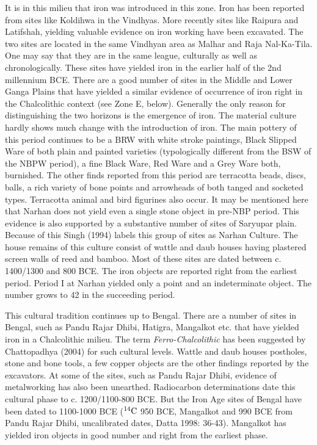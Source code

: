 It is in this milieu that iron was introduced in this zone. Iron has been reported from sites like Koldihwa in the Vindhyas. More recently sites like Raipura and Latifshah, yielding valuable evidence on iron working  have been excavated. The two sites are located in the same Vindhyan area as Malhar and Raja Nal-Ka-Tila. One may say that they are in the same league, culturally as well as chronologically. These sites have yielded iron in the earlier half of the 2nd millennium BCE. There are a good number of sites in the Middle and Lower Ganga Plains that have yielded a similar evidence of occurrence of iron right in the Chalcolithic context (see Zone E, below). Generally the only reason for distinguishing the two horizons is the emergence of iron. The material culture hardly shows much change with the introduction of iron. The main pottery of this period continues to be a BRW with white stroke paintings, Black Slipped Ware of both plain and painted varieties (typologically different from the BSW of the NBPW period), a fine Black Ware, Red Ware and a Grey Ware both, burnished.  The other finds reported from this period are terracotta beads, discs, balls, a rich variety of bone points and arrowheads of both tanged and socketed types. Terracotta animal and bird figurines also occur. It may be mentioned here that Narhan does not yield even a single stone object in pre-NBP period. This evidence is also supported by a substantive number of sites of Saryupar plain. Because of this Singh (1994) labels this group of sites as Narhan Culture. The house remains of this culture consist of wattle and daub houses having plastered screen walls of reed and bamboo. Most of these sites are dated between c. 1400/1300 and 800 BCE.  The iron objects are reported right from the earliest period. Period I at Narhan yielded only a point and an indeterminate object. The number grows to 42 in the succeeding period. 

This cultural tradition continues up to Bengal. There are a number of sites in Bengal, such as Pandu Rajar Dhibi, Hatigra, Mangalkot etc. that have yielded iron in a Chalcolithic milieu. The term \textit{Ferro-Chalcolithic} has been suggested by Chattopadhya (2004) for such cultural levels. Wattle and daub houses postholes, stone and bone tools, a few copper objects are the other findings reported by the excavators. At some of the sites, such as Pandu Rajar Dhibi, evidence of metalworking has also been unearthed. Radiocarbon determinations date this cultural phase to c. 1200/1100-800 BCE. But the Iron Age sites of Bengal have been dated to 1100-1000 BCE ($^{14}{\rm C}$ 950 BCE, Mangalkot and 990 BCE from Pandu Rajar Dhibi, uncalibrated dates, Datta 1998: 36-43). Mangalkot has yielded iron objects in good number and right from the earliest phase. 

